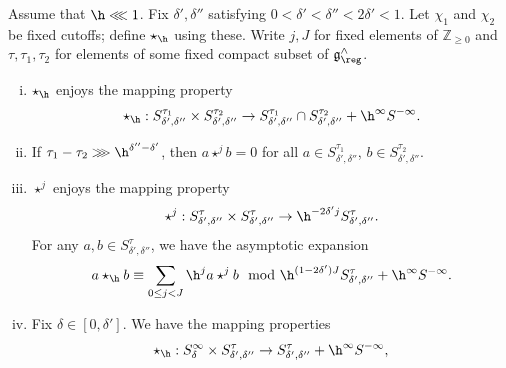 \begin{theorem}\label{thm:refined-star-prod}
  Assume that $\h \lll 1$.  Fix $\delta ', \delta ''$ satisfying $0 < \delta ' < \delta '' < 2 \delta ' < 1$.  Let $\chi_1$ and $\chi_2$ be fixed cutoffs; define $\star_{\h}$ using these.  Write $j, J$ for fixed elements of $\mathbb{Z}_{\geq 0}$ and $\tau, \tau_1, \tau_2$ for
  elements of some fixed compact subset of $\mathfrak{g}^\wedge_{\reg}$.
  \begin{enumerate}[(i)]
  \item \label{item:star-prod-1} $\star_{\h}$ enjoys the mapping property
    \begin{equation}\label{eqn:star-h-new-mapping-property-super-localized}
      \star_{\h} :
      S^{\tau_1}_{\delta', \delta''}
      \times
      S^{\tau_2}_{\delta', \delta''}
      \rightarrow
      S^{\tau_1}_{\delta', \delta ''}
      \cap S^{\tau_2}_{\delta', \delta ''}
      + \h^{\infty} S^{-\infty}.
    \end{equation}
  \item \label{item:star-prod-2} If $\tau_1 - \tau_2 \ggg \h^{\delta '' - \delta '}$, then $a \star^j b = 0$ for all $a \in S^{\tau_1}_{\delta',\delta''}$, $b \in S^{\tau_2}_{\delta ', \delta ''}$.
  \item \label{item:star-prod-3} $\star^j$ enjoys the mapping property
    \begin{equation}\label{eqn:star-j-new-mapping-property}
      \star^j :
      S_{\delta ', \delta ''}^{\tau }
      \times
      S_{\delta ', \delta ''}^{\tau }
      \rightarrow \h^{- 2 \delta' j}
      S^{\tau}_{\delta', \delta ''}.
    \end{equation}
    For any $a,b \in S_{\delta ', \delta ''}^\tau$, we have the asymptotic expansion
    \begin{equation}\label{eqn:star-j-asymp-expn-new}
      a \star_{\h} b
      \equiv  \sum_{0 \leq j < J}
      \h^j a \star^j b
      \mod{
        \h^{(1- 2 \delta') J} S^{\tau}_{\delta', \delta''}
        +
        \h^{\infty}
        S^{-\infty}}.
    \end{equation}
  \item \label{item:star-prod-4} Fix $\delta \in [0,\delta']$.  We have the mapping properties
    \begin{equation*}
      \star_{\h} : S^{\infty}_{\delta} \times S^{\tau}_{ \delta
        ', \delta ''}
      \rightarrow S^{\tau}_{ \delta ', \delta ''}
      + \h^\infty S^{-\infty},
    \end{equation*}
    \begin{equation*}

\end{equation*}
\end{enumerate}
\end{theorem}
